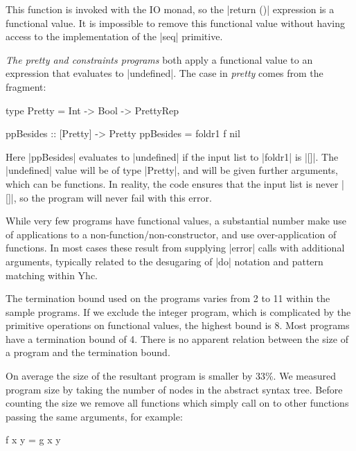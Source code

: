 \documentclass[preprint]{sigplanconf}
\begin{document}
This function is invoked with the IO monad, so the |return ()| expression is a functional value. It is impossible to remove this functional value without having access to the implementation of the |seq| primitive.

\textit{The pretty and constraints programs} both apply a functional value to an expression that evaluates to |undefined|. The case in \textit{pretty} comes from the fragment:

\begin{comment}
\begin{code}
data PrettyRep = PrettyRep
\end{code}
\end{comment}
\begin{code}
type Pretty = Int -> Bool -> PrettyRep

ppBesides     :: [Pretty] -> Pretty
ppBesides = foldr1 f nil
\end{code}

Here |ppBesides| evaluates to |undefined| if the input list to |foldr1| is |[]|. The |undefined| value will be of type |Pretty|, and will be given further arguments, which can be functions. In reality, the code ensures that the input list is never |[]|, so the program will never fail with this error.

While very few programs have functional values, a substantial number make use of applications to a non-function/non-constructor, and use over-application of functions. In most cases these result from supplying |error| calls with additional arguments, typically related to the desugaring of |do| notation and pattern matching within Yhc.

The termination bound used on the programs varies from 2 to 11 within the sample programs. If we exclude the integer program, which is complicated by the primitive operations on functional values, the highest bound is 8. Most programs have a termination bound of 4. There is no apparent relation between the size of a program and the termination bound.

On average the size of the resultant program is smaller by 33\%. We measured program size by taking the number of nodes in the abstract syntax tree. Before counting the size we remove all functions which simply call on to other functions passing the same arguments, for example:

\begin{code}
f x y = g x y
\end{code}
\end{document}
